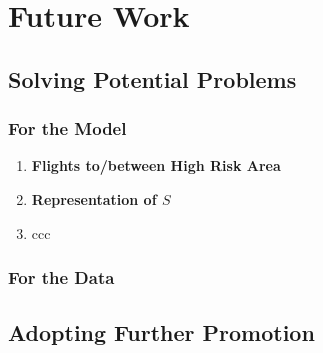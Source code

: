 \section{Future Work}

\subsection{Solving Potential Problems}

\subsubsection{For the Model}

\begin{enumerate}
    \item \textbf{Flights to/between High Risk Area}
    \item \textbf{Representation of $S$}
    \item ccc
\end{enumerate}

\subsubsection{For the Data}

\subsection{Adopting Further Promotion}



